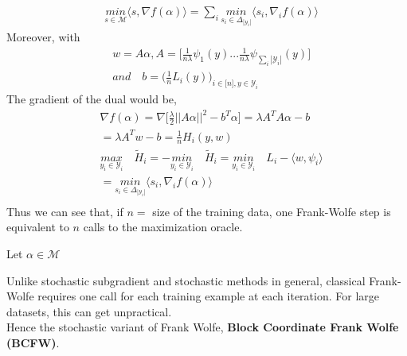 \begin{equation*}
\begin{aligned}
    &\underset{s\in\mathcal{M}}{\textit{min}}\langle s, \nabla f(\alpha)\rangle
= \sum_{i}\underset{s_{i}\in\Delta_{|\mathcal{Y}_{i}|}}{\textit{min}}\langle
s_{i}, \nabla_{i} f(\alpha)\rangle
\end{aligned}
\end{equation*}
Moreover, with
\begin{equation*}
\begin{aligned}
   &w=A\alpha, A=\Big[\frac{1}{n\lambda}\psi_{1}(y)...\frac{1}{n\lambda}\psi_{\sum_{i}|\mathcal{Y}_{i}|}(y)\Big]\\
   &\textit{and}\quad b=\Big(\frac{1}{n}L_{i}(y)\Big)_{i\in\big[n\big],y\in\mathcal{Y}_{i}}
\end{aligned}
\end{equation*}
The gradient of the dual would be,
\begin{equation*}
\begin{aligned}
    &\nabla f(\alpha)= \nabla\Big[\frac{\lambda}{2}||A\alpha||^{2}- b^{T}\alpha\Big] = \lambda A^{T}A\alpha- b\\
    &= \lambda A^{T}w- b= \frac{1}{n}H_{i}(y,w)\\
    &\underset{y_{i}\in\mathcal{Y}_{i}}{\textit{max}}\quad\tilde{H}_{i}=
  -\underset{y_{i}\in\mathcal{Y}_{i}}{\textit{min}}\quad\tilde{H}_{i} =
  \underset{y_{i}\in\mathcal{Y}_{i}}{\textit{min}}\quad L_{i}- \langle w,
  \psi_{i}\rangle\\ &=
  \underset{s_{i}\in\Delta_{|\mathcal{Y}_{i}|}}{\textit{min}}\langle s_{i},
  \nabla_{i} f(\alpha)\rangle\\
\end{aligned}
\end{equation*}
Thus we can see that, if $n=$ size of the training data, one Frank-Wolfe step is equivalent to $n$ calls to the maximization oracle.
\begin{algorithmic}
   \STATE Let $\alpha\in\mathcal{M}$
    \\
   \ENDFOR
   \ENDFOR
\end{algorithmic}

Unlike stochastic subgradient and stochastic methods in general, classical
Frank-Wolfe requires one call for each training example at each iteration. For
large datasets, this can get unpractical.\\ Hence the stochastic variant of
Frank Wolfe, \textbf{Block Coordinate Frank Wolfe (BCFW)}.\\



